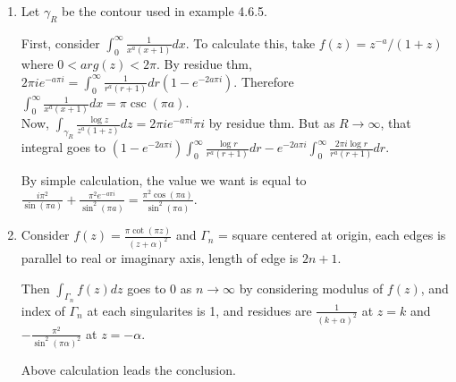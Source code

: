 \begin{problem}[4.4] \hfill
	\begin{enumerate}[label = (\alph*)]
		\item Let $\gamma_R$ be the contour used in example 4.6.5.

			First, consider $\int_0^\infty \frac{1}{x^a(x+1)} dx$. To calculate this, take $f(z) = z^{-a}/(1+z)$ where $0 < arg(z) < 2\pi$.
			By residue thm, $2\pi i e^{-a\pi i} = \int_0^\infty \frac{1}{r^a(r+1)} dr \left( 1-e^{-2a\pi i} \right)$.
			Therefore $\int_0^\infty \frac{1}{x^a(x+1)}dx = \pi \csc (\pi a)$. \\

			Now, $\int_{\gamma_R}\frac{\log z}{z^a(1+z)}dz = 2\pi i e^{-a\pi i} \pi i$ by residue thm. But as $R \rightarrow \infty$, that integral goes to $(1-e^{-2a\pi i})\int_0^\infty \frac{\log r }{r^a(r+1)}dr -e^{-2a\pi i} \int_0^\infty \frac{2\pi i \log r }{r^a (r+1)}dr$.

			By simple calculation, the value we want is equal to $\frac{i \pi^2}{\sin (\pi a)} + \frac{\pi^2 e^{-a\pi i}}{\sin^2 (\pi a)} = \frac{\pi^2 \cos (\pi a)}{\sin^2 (\pi a)}$.

		\item Consider $f(z) = \frac{\pi \cot (\pi z)}{\left( z+\alpha \right)^2}$ and $\Gamma_n$ = square centered at origin, each edges is parallel to real or imaginary axis, length of edge is $2n+1$.

			Then $\int_{\Gamma_n} f(z) dz$ goes to 0 as $n \rightarrow \infty$ by considering modulus of $f(z)$, and index of $\Gamma_n$ at each singularites is 1, and residues are $\frac{1}{\left( k+\alpha \right)^2}$ at $z = k$ and $-\frac{\pi^2}{\sin^2(\pi \alpha)^2}$ at $z = -\alpha$.

			Above calculation leads the conclusion.
	\end{enumerate}
	
\end{problem}

